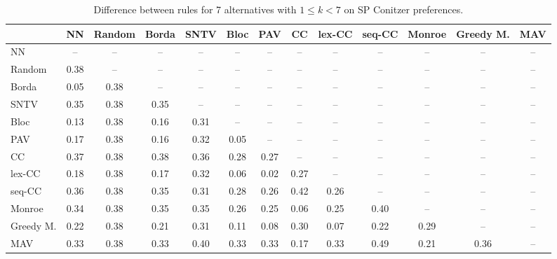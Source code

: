 
\begin{table*}[h!]
\centering
\begin{tabular}{lcccccccccccc}
\toprule
 & NN & Random & Borda & SNTV & Bloc & PAV & CC & lex-CC & seq-CC & Monroe & Greedy M. & MAV \\
\midrule
NN & -- & -- & -- & -- & -- & -- & -- & -- & -- & -- & -- & -- \\
Random & 0.38 & -- & -- & -- & -- & -- & -- & -- & -- & -- & -- & -- \\
Borda & 0.05 & 0.38 & -- & -- & -- & -- & -- & -- & -- & -- & -- & -- \\
SNTV & 0.35 & 0.38 & 0.35 & -- & -- & -- & -- & -- & -- & -- & -- & -- \\
Bloc & 0.13 & 0.38 & 0.16 & 0.31 & -- & -- & -- & -- & -- & -- & -- & -- \\
PAV & 0.17 & 0.38 & 0.16 & 0.32 & 0.05 & -- & -- & -- & -- & -- & -- & -- \\
CC & 0.37 & 0.38 & 0.38 & 0.36 & 0.28 & 0.27 & -- & -- & -- & -- & -- & -- \\
lex-CC & 0.18 & 0.38 & 0.17 & 0.32 & 0.06 & 0.02 & 0.27 & -- & -- & -- & -- & -- \\
seq-CC & 0.36 & 0.38 & 0.35 & 0.31 & 0.28 & 0.26 & 0.42 & 0.26 & -- & -- & -- & -- \\
Monroe & 0.34 & 0.38 & 0.35 & 0.35 & 0.26 & 0.25 & 0.06 & 0.25 & 0.40 & -- & -- & -- \\
Greedy M. & 0.22 & 0.38 & 0.21 & 0.31 & 0.11 & 0.08 & 0.30 & 0.07 & 0.22 & 0.29 & -- & -- \\
MAV & 0.33 & 0.38 & 0.33 & 0.40 & 0.33 & 0.33 & 0.17 & 0.33 & 0.49 & 0.21 & 0.36 & -- \\
\bottomrule
\end{tabular}

\caption{Difference between rules for 7 alternatives with $1 \leq k < 7$ on SP Conitzer preferences.}
\end{table*}
